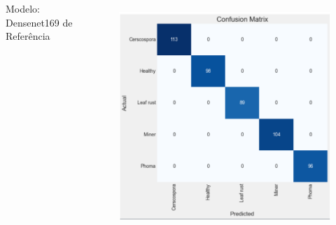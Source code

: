 \documentclass[aspectratio=169]{beamer}
\begin{document}
\begin{frame}
\begin{columns}
        \centering
        \tiny Modelo: Densenet169 de Referência
        \begin{figure}
            \centering
            \includegraphics[scale=0.35]{img/densenet169referencia.png}
            \label{fig:enter-label}
        \end{figure}



    \end{columns}
\end{frame}






\end{document}
